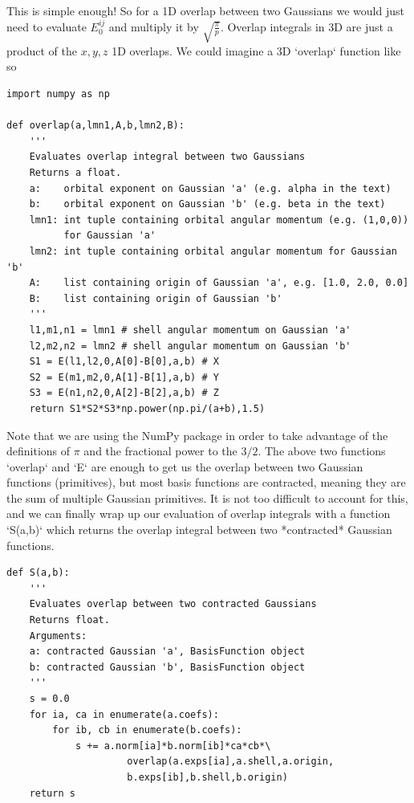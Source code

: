 This is simple enough! So for a 1D overlap between two Gaussians we
would just need to evaluate $E_0^{ij}$ and multiply it by
$\sqrt{\frac{\pi}{p}}$. Overlap integrals in 3D are just a product of
the $x,y,z$ 1D overlaps. We could imagine a 3D `overlap` function like
so

\begin{lstlisting}[style=MyPython]
import numpy as np

def overlap(a,lmn1,A,b,lmn2,B):
    ''' 
    Evaluates overlap integral between two Gaussians
    Returns a float.
    a:    orbital exponent on Gaussian 'a' (e.g. alpha in the text)
    b:    orbital exponent on Gaussian 'b' (e.g. beta in the text)
    lmn1: int tuple containing orbital angular momentum (e.g. (1,0,0))
          for Gaussian 'a'
    lmn2: int tuple containing orbital angular momentum for Gaussian 'b'
    A:    list containing origin of Gaussian 'a', e.g. [1.0, 2.0, 0.0]
    B:    list containing origin of Gaussian 'b'
    '''
    l1,m1,n1 = lmn1 # shell angular momentum on Gaussian 'a'
    l2,m2,n2 = lmn2 # shell angular momentum on Gaussian 'b'
    S1 = E(l1,l2,0,A[0]-B[0],a,b) # X
    S2 = E(m1,m2,0,A[1]-B[1],a,b) # Y
    S3 = E(n1,n2,0,A[2]-B[2],a,b) # Z
    return S1*S2*S3*np.power(np.pi/(a+b),1.5) 
\end{lstlisting}

Note that we are using the NumPy package in order to take advantage of
the definitions of $\pi$ and the fractional power to the $3/2$. The
above two functions `overlap` and `E` are enough to get us the overlap
between two Gaussian functions (primitives), but most basis functions
are contracted, meaning they are the sum of multiple Gaussian
primitives. It is not too difficult to account for this, and we can
finally wrap up our evaluation of overlap integrals with a function
`S(a,b)` which returns the overlap integral between two *contracted*
Gaussian functions.

\begin{lstlisting}[style=MyPython]
def S(a,b):
    '''
    Evaluates overlap between two contracted Gaussians
    Returns float.
    Arguments:
    a: contracted Gaussian 'a', BasisFunction object
    b: contracted Gaussian 'b', BasisFunction object
    '''
    s = 0.0
    for ia, ca in enumerate(a.coefs):
        for ib, cb in enumerate(b.coefs):
            s += a.norm[ia]*b.norm[ib]*ca*cb*\
                     overlap(a.exps[ia],a.shell,a.origin,
                     b.exps[ib],b.shell,b.origin)
    return s
\end{lstlisting}

